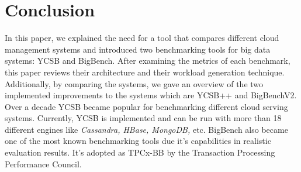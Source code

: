 \documentclass[sigconf,10pt]{acmart}
\begin{document}
\section{Conclusion}
In this paper, we explained the need for a tool that compares different cloud management systems and introduced two benchmarking tools for big data systems: YCSB and BigBench. After examining the metrics of each benchmark, this paper reviews their architecture and their workload generation technique. Additionally, by comparing the systems, we gave an overview of the two implemented improvements to the systems which are YCSB++ and BigBenchV2. 
\newline \newline
Over a decade YCSB became popular for benchmarking different cloud serving systems. Currently, YCSB is implemented and can be run with more than 18 different engines like \emph{Cassandra, HBase, MongoDB,} etc.\newline
\newline
BigBench also became one of the most known benchmarking tools due it's capabilities in realistic evaluation results. It's adopted as TPCx-BB by the Transaction Processing Performance Council.
\end{document}
